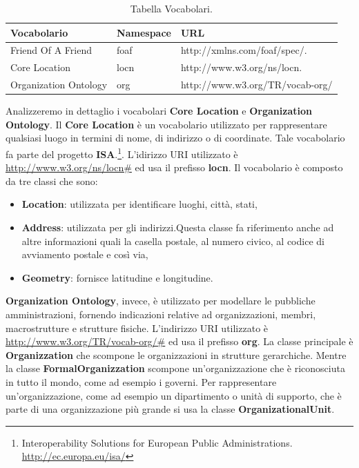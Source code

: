\documentclass[a4paper,11pt]{article}
\begin{document}
\begin{table}[!htbp]
\begin{center}				
\begin{tabular}{|>{\small}l|>{\small}l|>{\small}l|}
	\hline	\textbf{Vocabolario} & \textbf{Namespace} & \textbf{URL}\\				
	\hline	Friend Of A Friend & foaf & http://xmlns.com/foaf/spec/.\\
	\hline	Core Location & locn & http://www.w3.org/ns/locn.\\
	\hline	Organization Ontology & org & http://www.w3.org/TR/vocab-org/\\
	\hline			
\end{tabular}	
\caption{Tabella Vocabolari.}	
\end{center}	
\end{table}
Analizzeremo in dettaglio i vocabolari \textbf{Core Location} e \textbf{Organization Ontology}.
Il \textbf{Core Location} è un vocabolario utilizzato per rappresentare qualsiasi luogo in termini di nome, di indirizzo o di coordinate. Tale vocabolario fa parte del progetto \textbf{ISA}.\footnote{Interoperability Solutions for European Public Administrations. \url{http://ec.europa.eu/isa/}}. L'idirizzo URI utilizzato è \url{http://www.w3.org/ns/locn\#} ed usa il prefisso \textbf{locn}. \newline Il vocabolario è composto da tre classi che sono:
\begin{itemize}
	\item \textbf{Location}: utilizzata per identificare luoghi, città, stati,  
	\item \textbf{Address}: utilizzata per gli indirizzi.Questa classe fa riferimento anche ad altre informazioni quali la casella postale, al numero civico, al codice di avviamento postale e così via,
	\item \textbf{Geometry}: fornisce latitudine e longitudine.
\end{itemize} 
\textbf{Organization Ontology}, invece, è utilizzato per modellare le pubbliche amministrazioni, fornendo indicazioni relative ad organizzazioni, membri, macrostrutture e strutture fisiche.
L'indirizzo URI utilizzato è \url{http://www.w3.org/TR/vocab-org/\#} ed usa il prefisso \textbf{org}.\newline
La classe principale è \textbf{Organizzation} che scompone le organizzazioni in strutture gerarchiche.
Mentre la classe \textbf{FormalOrganizzation} scompone un'organizzazione che è riconosciuta in tutto il mondo, come ad esempio i governi.
Per rappresentare un'organizzazione, come ad esempio un dipartimento o unità di supporto, che è parte di una organizzazione più grande si usa la classe \textbf{OrganizationalUnit}.
\end{document}
